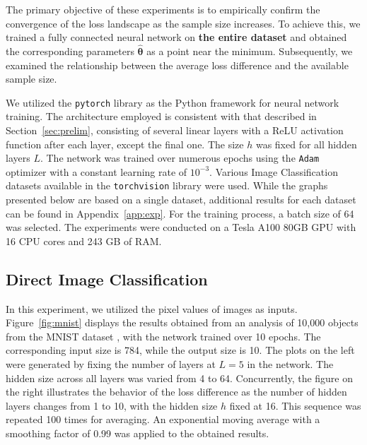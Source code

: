 \documentclass{article}
\begin{document}
The primary objective of these experiments is to empirically confirm the convergence of the loss landscape as the sample size increases. To achieve this, we trained a fully connected neural network on \textbf{the entire dataset} and obtained the corresponding parameters $\hat{\boldsymbol{\theta}}$ as a point near the minimum. Subsequently, we examined the relationship between the average loss difference and the available sample size.

We utilized the \texttt{pytorch} library \cite{pytorch} as the Python framework for neural network training. The architecture employed is consistent with that described in Section~\ref{sec:prelim}, consisting of several linear layers with a ReLU activation function after each layer, except the final one. The size $h$ was fixed for all hidden layers $L$. The network was trained over numerous epochs using the \texttt{Adam} optimizer \cite{adam} with a constant learning rate of $10^{-3}$. Various Image Classification datasets available in the \texttt{torchvision} library were used. While the graphs presented below are based on a single dataset, additional results for each dataset can be found in Appendix~\ref{app:exp}. For the training process, a batch size of 64 was selected. The experiments were conducted on a Tesla A100 80GB GPU with 16 CPU cores and 243 GB of RAM.

\subsection{Direct Image Classification}

In this experiment, we utilized the pixel values of images as inputs. Figure~\ref{fig:mnist} displays the results obtained from an analysis of 10,000 objects from the MNIST dataset \cite{deng2012mnist}, with the network trained over 10 epochs. The corresponding input size is 784, while the output size is 10. The plots on the left were generated by fixing the number of layers at $L=5$ in the network. The hidden size across all layers was varied from 4 to 64. Concurrently, the figure on the right illustrates the behavior of the loss difference as the number of hidden layers changes from 1 to 10, with the hidden size $h$ fixed at 16. This sequence was repeated 100 times for averaging. An exponential moving average with a smoothing factor of 0.99 was applied to the obtained results.
\end{document}
